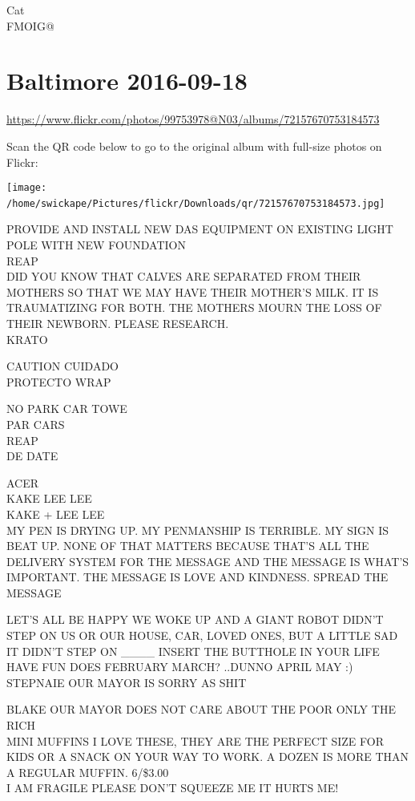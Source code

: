 \documentclass[10pt,letterpaper]{article}
\begin{document}
Cat\\
FMOIG@
\

\section*{Baltimore 2016-09-18}

\url{https://www.flickr.com/photos/99753978@N03/albums/72157670753184573}

Scan the QR code below to go to the original album with full-size photos on Flickr:

\texttt{[image: /home/swickape/Pictures/flickr/Downloads/qr/72157670753184573.jpg]}
\

PROVIDE AND INSTALL NEW DAS EQUIPMENT ON EXISTING LIGHT POLE WITH NEW FOUNDATION\\
REAP\\
DID YOU KNOW THAT CALVES ARE SEPARATED FROM THEIR MOTHERS SO THAT WE MAY HAVE THEIR MOTHER'S MILK.  IT IS TRAUMATIZING FOR BOTH.  THE MOTHERS MOURN THE LOSS OF THEIR NEWBORN.  PLEASE RESEARCH.\\
KRATO

CAUTION CUIDADO\\
PROTECTO WRAP

NO PARK CAR TOWE\\
PAR CARS\\
REAP\\
DE DATE

ACER\\
KAKE LEE LEE\\
KAKE + LEE LEE\\
MY PEN IS DRYING UP.  MY PENMANSHIP IS TERRIBLE.  MY SIGN IS BEAT UP.  NONE OF THAT MATTERS BECAUSE THAT'S ALL THE DELIVERY SYSTEM FOR THE MESSAGE AND THE MESSAGE IS WHAT'S IMPORTANT.  THE MESSAGE IS LOVE AND KINDNESS.  SPREAD THE MESSAGE

LET'S ALL BE HAPPY WE WOKE UP AND A GIANT ROBOT DIDN'T STEP ON US OR OUR HOUSE, CAR, LOVED ONES, BUT A LITTLE SAD IT DIDN'T STEP ON \_\_\_\_ INSERT THE BUTTHOLE IN YOUR LIFE\\
HAVE FUN DOES FEBRUARY MARCH?  ..DUNNO APRIL MAY :)\\
STEPNAIE OUR MAYOR IS SORRY AS SHIT

BLAKE OUR MAYOR DOES NOT CARE ABOUT THE POOR ONLY THE RICH\\
MINI MUFFINS I LOVE THESE, THEY ARE THE PERFECT SIZE FOR KIDS OR A SNACK ON YOUR WAY TO WORK.  A DOZEN IS MORE THAN A REGULAR MUFFIN.  6/\$3.00\\
I AM FRAGILE PLEASE DON'T SQUEEZE ME IT HURTS ME!
\end{document}
